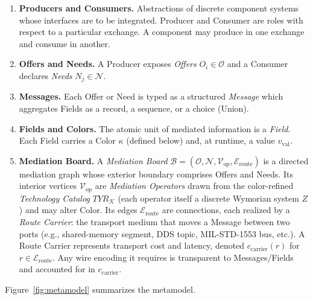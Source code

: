 \begin{enumerate}[topsep=2pt, itemsep=1pt, leftmargin=1.8em]
    \item \textbf{Producers and Consumers.} Abstractions of discrete component systems whose interfaces are to be integrated.  Producer and Consumer are roles with respect to a particular exchange.  A component may produce in one exchange and consume in another.
    \item \textbf{Offers and Needs.} A Producer exposes \emph{Offers} $O_i \in \mathcal{O}$ and a Consumer declares \emph{Needs} $N_j \in \mathcal{N}$.
    \item \textbf{Messages.} Each Offer or Need is typed as a structured \emph{Message} which aggregates Fields as a record, a sequence, or a choice (Union).
    \item \textbf{Fields and Colors.} The atomic unit of mediated information is a \emph{Field}.  Each Field carries a Color $\kappa$ (defined below) and, at runtime, a value $v_{\text{val}}$.
    \item \textbf{Mediation Board.} A \emph{Mediation Board} $\mathcal{B} = (\mathcal{O}, \mathcal{N}, \mathcal{V}_{\text{op}}, \mathcal{E}_{\text{route}})$ is a directed mediation graph whose exterior boundary comprises Offers and Needs.  Its interior vertices $\mathcal{V}_{\text{op}}$ are \emph{Mediation Operators} drawn from the color-refined \emph{Technology Catalog} $TYR_{\mathcal{K}}$ (each operator itself a discrete Wymorian system $Z$) and may alter Color.  Its edges $\mathcal{E}_{\text{route}}$ are connections, each realized by a \emph{Route Carrier}: the transport medium that moves a Message between two ports (e.g., shared-memory segment, DDS topic, MIL-STD-1553 bus, etc.).  A Route Carrier represents transport cost and latency, denoted $c_{\text{carrier}}(r)$ for $r \in \mathcal{E}_{\text{route}}$.  Any wire encoding it requires is transparent to Messages/Fields and accounted for in $c_{\text{carrier}}$.
\end{enumerate}

Figure~\ref{fig:metamodel} summarizes the metamodel.

